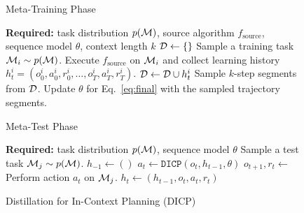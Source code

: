 \documentclass{article}
\begin{document}
\begin{figure*}[t]
    \vspace{-13pt}
    \begin{minipage}[t!]{0.49\textwidth}
        \begin{algorithm}[H]
            \caption{Meta-Training Phase}
            \label{alg:train}
            \begin{algorithmic}[1]
                \STATE \textbf{Required:} task distribution $p({\mathcal{M}})$, source algorithm $f_\textrm{source}$, sequence model $\theta$, context length $k$
                \STATE ${\mathcal{D}} \gets \{\}$
                    \STATE Sample a training task ${\mathcal{M}}_i \sim p({\mathcal{M}})$.
                    \STATE Execute $f_\textrm{source}$ on ${\mathcal{M}}_i$ and collect learning history $h_t^i=(o_0^i, a_0^i, r_0^i, \dots, o_T^i, a_T^i, r_T^i)$.
                    \STATE ${\mathcal{D}} \gets {\mathcal{D}} \cup h_t^i$
                \ENDFOR
                    \STATE Sample $k$-step segments from ${\mathcal{D}}$.
                    \STATE Update $\theta$ for Eq.~\ref{eq:final} with the sampled trajectory segments.
                \ENDWHILE
            \end{algorithmic}
        \end{algorithm}
        \vspace{-5.45mm}
        \begin{algorithm}[H]
            \caption{Meta-Test Phase}
            \label{alg:test}
            \begin{algorithmic}[1]
                \STATE \textbf{Required:} task distribution $p({\mathcal{M}})$, sequence model $\theta$
                    \STATE Sample a test task ${\mathcal{M}}_j \sim p({\mathcal{M}})$.
                    \STATE $h_{-1} \gets ()$
                        \STATE $a_t \gets \texttt{DICP}(o_t, h_{t-1}, \theta)$\label{alg:test:act}
                        \STATE $o_{t+1}, r_t \gets$ Perform action $a_t$ on ${\mathcal{M}}_j$.
                        \STATE $h_t \gets (h_{t-1},o_t,a_t,r_t) $
                    \ENDFOR
                \ENDFOR
            \end{algorithmic}
        \end{algorithm}
    \end{minipage}
    \hfill
    \begin{minipage}[t!]{0.49\textwidth}
        \begin{algorithm}[H]
            \caption{Distillation for In-Context Planning (DICP)}
            \label{alg:icp}

\end{algorithm}
\end{minipage}
\end{figure*}
\end{document}
